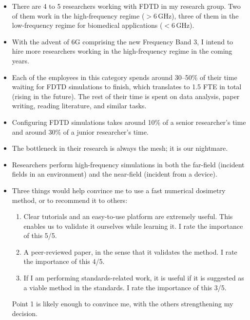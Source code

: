 \documentclass[11pt]{article}
\begin{document}
\medskip
\begin{itemize}[leftmargin=1.4em,itemsep=0.5em]

  \item There are 4 to 5 researchers working with FDTD in my research group. Two of them work
  in the high-frequency regime ($>6$\,GHz), three of them in the low-frequency regime for
  biomedical applications ($<6$\,GHz).

  \item With the advent of 6G comprising the new Frequency Band 3, I intend to hire more
  researchers working in the high-frequency regime in the coming years.

  \item Each of the employees in this category spends around 30--50\% of their time waiting
  for FDTD simulations to finish, which translates to 1.5 FTE in total (rising in the future).
  The rest of their time is spent on data analysis, paper writing, reading literature, and
  similar tasks.

  \item Configuring FDTD simulations takes around 10\% of a senior researcher's time and
  around 30\% of a junior researcher's time.

  \item The bottleneck in their research is always the mesh; it is our nightmare.

  \item Researchers perform high-frequency simulations in both the far-field (incident fields
  in an environment) and the near-field (incident from a device).

  \item Three things would help convince me to use a fast numerical dosimetry method, or to
  recommend it to others:
  \begin{enumerate}[leftmargin=1.6em,topsep=0.3em,itemsep=0.2em]
    \item Clear tutorials and an easy-to-use platform are extremely useful. This enables us to
    validate it ourselves while learning it. I rate the importance of this 5/5.
    \item A peer-reviewed paper, in the sense that it validates the method. I rate the
    importance of this 4/5.
    \item If I am performing standards-related work, it is useful if it is suggested as a
    viable method in the standards. I rate the importance of this 3/5.
  \end{enumerate}
  Point 1 is likely enough to convince me, with the others strengthening my decision.


\end{itemize}
\end{document}
